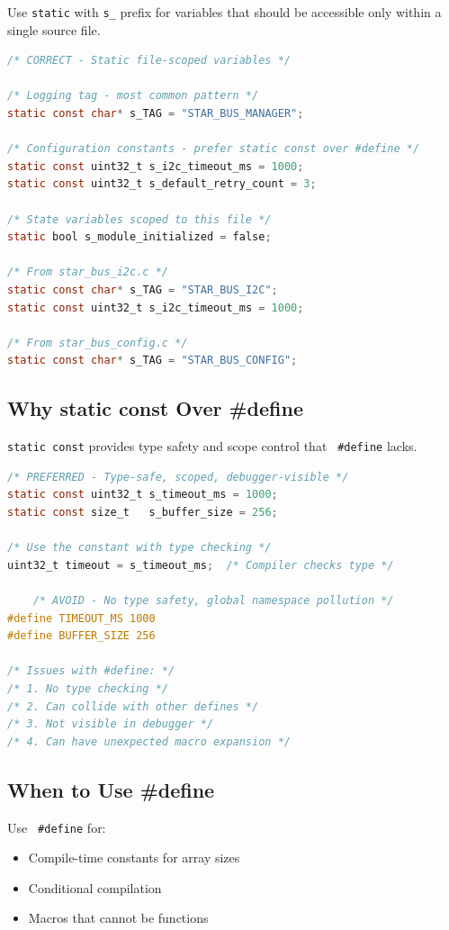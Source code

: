 Use \texttt{static} with \texttt{s\_} prefix for variables that should be accessible only within a single source file.

\begin{lstlisting}[language=C]
/* CORRECT - Static file-scoped variables */

/* Logging tag - most common pattern */
static const char* s_TAG = "STAR_BUS_MANAGER";

/* Configuration constants - prefer static const over #define */
static const uint32_t s_i2c_timeout_ms = 1000;
static const uint32_t s_default_retry_count = 3;

/* State variables scoped to this file */
static bool s_module_initialized = false;

/* From star_bus_i2c.c */
static const char* s_TAG = "STAR_BUS_I2C";
static const uint32_t s_i2c_timeout_ms = 1000;

/* From star_bus_config.c */
static const char* s_TAG = "STAR_BUS_CONFIG";
\end{lstlisting}

\subsection{Why static const Over \#define}

\texttt{static const} provides type safety and scope control that \texttt{
      \#define} lacks.

\begin{lstlisting}[language=C]
/* PREFERRED - Type-safe, scoped, debugger-visible */
static const uint32_t s_timeout_ms = 1000;
static const size_t   s_buffer_size = 256;

/* Use the constant with type checking */
uint32_t timeout = s_timeout_ms;  /* Compiler checks type */

    /* AVOID - No type safety, global namespace pollution */
#define TIMEOUT_MS 1000
#define BUFFER_SIZE 256

/* Issues with #define: */
/* 1. No type checking */
/* 2. Can collide with other defines */
/* 3. Not visible in debugger */
/* 4. Can have unexpected macro expansion */
\end{lstlisting}

\subsection{When to Use \#define}

Use \texttt{
      \#define} for:
\begin{itemize}
    \item Compile-time constants for array sizes
    \item Conditional compilation
    \item Macros that cannot be functions
\end{itemize}

